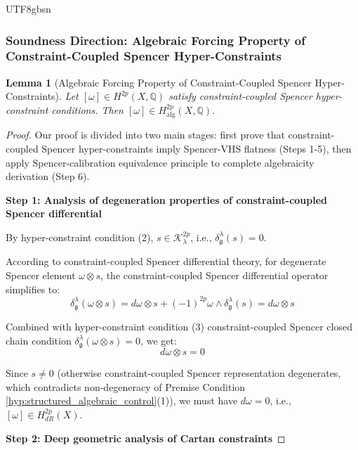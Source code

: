\documentclass[a4paper,12pt]{extarticle}
\newtheorem{lemma}[theorem]{Lemma}
\theoremstyle{definition}
\begin{document}
\begin{CJK}{UTF8}{gbsn}
\subsubsection{Soundness Direction: Algebraic Forcing Property of Constraint-Coupled Spencer Hyper-Constraints}
\label{subsubsec:soundness_direction}

\begin{lemma}[Algebraic Forcing Property of Constraint-Coupled Spencer Hyper-Constraints]
\label{lem:constraint_spencer_algebraic_forcing}
Let $[\omega] \in H^{2p}(X, \mathbb{Q})$ satisfy constraint-coupled Spencer hyper-constraint conditions. Then $[\omega] \in H_{\text{alg}}^{2p}(X, \mathbb{Q})$.
\end{lemma}

\begin{proof}
Our proof is divided into two main stages: first prove that constraint-coupled Spencer hyper-constraints imply Spencer-VHS flatness (Steps 1-5), then apply Spencer-calibration equivalence principle to complete algebraicity derivation (Step 6).

\textbf{Step 1: Analysis of degeneration properties of constraint-coupled Spencer differential}

By hyper-constraint condition (2), $s \in \mathcal{K}^{2p}_\lambda$, i.e., $\delta^\lambda_\mathfrak{g}(s) = 0$.

According to constraint-coupled Spencer differential theory, for degenerate Spencer element $\omega \otimes s$, the constraint-coupled Spencer differential operator simplifies to:
\begin{equation}
\label{eq:degenerate_constraint_spencer_differential}
\delta^\lambda_\mathfrak{g}(\omega \otimes s) = d\omega \otimes s + (-1)^{2p} \omega \wedge \delta^\lambda_\mathfrak{g}(s) = d\omega \otimes s
\end{equation}

Combined with hyper-constraint condition (3) constraint-coupled Spencer closed chain condition $\delta^\lambda_\mathfrak{g}(\omega \otimes s) = 0$, we get:
\begin{equation}
\label{eq:omega_closed}
d\omega \otimes s = 0
\end{equation}

Since $s \neq 0$ (otherwise constraint-coupled Spencer representation degenerates, which contradicts non-degeneracy of Premise Condition \ref{hyp:structured_algebraic_control}(1)), we must have $d\omega = 0$, i.e., $[\omega] \in H^{2p}_{dR}(X)$.

\textbf{Step 2: Deep geometric analysis of Cartan constraints}


\end{proof}
\end{CJK}
\end{document}
